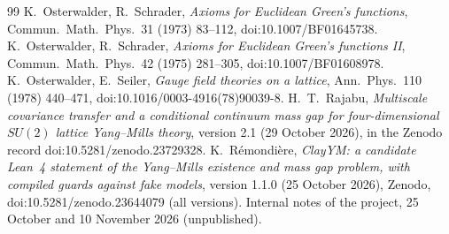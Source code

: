\documentclass[11pt,a4paper]{article}
\theoremstyle{plain}
\theoremstyle{definition}
\theoremstyle{remark}
\numberwithin{equation}{section}
\begin{document}
{\begin{thebibliography}{99}
 K.~Osterwalder, R.~Schrader, \emph{Axioms for Euclidean Green's functions}, Commun.\ Math.\ Phys.\ 31 (1973) 83--112,
doi:10.1007/BF01645738.
 K.~Osterwalder, R.~Schrader, \emph{Axioms for Euclidean Green's functions II}, Commun.\ Math.\ Phys.\ 42 (1975)
281--305, doi:10.1007/BF01608978.
 K.~Osterwalder, E.~Seiler, \emph{Gauge field theories on a lattice}, Ann.\ Phys.\ 110 (1978) 440--471,
doi:10.1016/0003-4916(78)90039-8.
 H.~T.~Rajabu, \emph{Multiscale covariance transfer and a conditional continuum mass gap for four-dimensional $SU(2)$
lattice Yang--Mills theory}, version 2.1 (29 October 2026), in the Zenodo record doi:10.5281/zenodo.23729328.
 K.~R\'emondi\`ere, \emph{ClayYM: a candidate Lean~4 statement of the Yang--Mills existence and mass gap problem, with
compiled guards against fake models}, version 1.1.0 (25 October 2026), Zenodo, doi:10.5281/zenodo.23644079 (all versions).
 Internal notes of the project, 25 October and 10 November 2026 (unpublished).
\end{thebibliography}}
\end{document}

